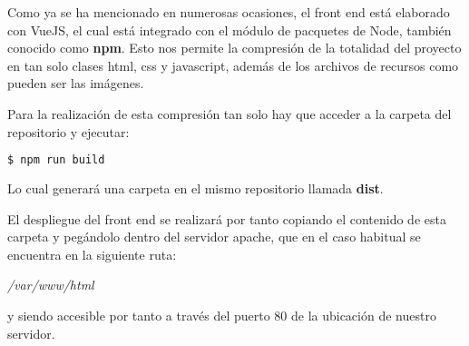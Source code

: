 Como ya se ha mencionado en numerosas ocasiones, el front end está elaborado con VueJS, el cual está integrado con el módulo de pacquetes de Node, también conocido como \textbf{npm}.
Esto nos permite la compresión de la totalidad del proyecto en tan solo clases html, css y javascript, además de los archivos de recursos como pueden ser las imágenes.

Para la realización de esta compresión tan solo hay que acceder a la carpeta del repositorio y ejecutar:

    \begin{lstlisting}[language=bash]
        $ npm run build
    \end{lstlisting}
    
    Lo cual generará una carpeta en el mismo repositorio llamada \textbf{dist}.
    
    El despliegue del front end se realizará por tanto copiando el contenido de esta carpeta y pegándolo dentro del servidor apache, que en el caso habitual se encuentra en la siguiente ruta:
    
    \textit{/var/www/html}
    
    y siendo accesible por tanto a través del puerto 80 de la ubicación de nuestro servidor.